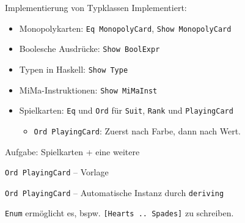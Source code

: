 \documentclass{beamer}
\begin{document}
\begin{frame}{Implementierung von Typklassen}
  Implementiert:

  \vfill

  \begin{itemize}
    \item Monopolykarten: \texttt{Eq MonopolyCard}, \texttt{Show MonopolyCard}
    \item Boolesche Ausdrücke: \texttt{Show BoolExpr}
    \item Typen in Haskell: \texttt{Show Type}
    \item MiMa-Instruktionen: \texttt{Show MiMaInst}
    \item Spielkarten: \texttt{Eq} und \texttt{Ord} für \texttt{Suit}, \texttt{Rank} und \texttt{PlayingCard}
    \begin{itemize}
      \item \texttt{Ord PlayingCard}: Zuerst nach Farbe, dann nach Wert.
    \end{itemize}
  \end{itemize}

  \vfill
  
  Aufgabe: Spielkarten + eine weitere
\end{frame}

\begin{frame}{\texttt{Ord PlayingCard} -- Vorlage}
\end{frame}

\begin{frame}{\texttt{Ord PlayingCard} -- Automatische Instanz durch \texttt{deriving}}

  \texttt{Enum} ermöglicht es, bspw. \texttt{[Hearts .. Spades]} zu schreiben.
\end{frame}
\end{document}
